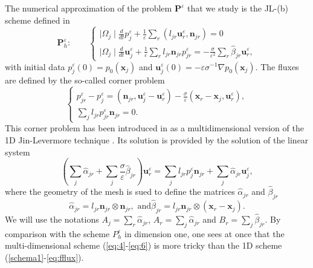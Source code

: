 \documentclass[a4paper,french,english,10pt]{article}
\newcommand\ljr{l_{jr}}
\newcommand\njr{\mathbf{n}_{jr}}
\newcommand\uu{\mathbf{u}}
\newcommand\eps{\varepsilon}
\newcommand\alj{\widehat{\alpha}_{jr}}
\newcommand\bej{\widehat{\beta}_{jr}}
\newcommand\xj{\mathbf{x}_j}
\newcommand\xr{\mathbf{x}_r}
\newcommand\uj{\uu_j}
\newcommand\ur{\uu_r}
\begin{document}
The numerical approximation  
 of the problem  $\mathbf P^\eps$ that we study 
 is the JL-(b) scheme defined
in   \cite{glaceap}
\begin{equation}\label{eq:4}
\mathbf P_h^\eps:
\qquad \left\{ 
\begin{array}{l}
\displaystyle \mid\Omega_{j}\mid\frac{d}{dt} p_{j}^{\eps}+\frac{1}{\varepsilon}
\sum_{r}(l_{jr}\ur^{\eps},\njr)=0\\
\displaystyle \mid
\Omega_{j}\mid\frac{d}{dt}\uj^{\eps}+\frac{1}{\varepsilon}
\sum_{r} l_{jr} \njr    p_{jr}^{\eps}=-\frac{\sigma}{\varepsilon^{2}}\sum_{r}\widehat{
\beta}_{jr}\ur^{\eps},
\end{array}
\right.
\end{equation}
with initial data $p_j^{\eps}(0)=p_0(\mathbf{x}_j)$ and $\mathbf{u}_j^{\eps}(0) = -\eps\sigma^{-1}\nabla p_0(\mathbf{x}_j)$.
The fluxes are defined by the so-called 
corner problem 
\begin{equation}\label{eq:5}
\left\{ \begin{array}{l}
\displaystyle 
p_{jr}^{\eps}-p_j^\eps=
(\njr,    \uj^{\eps}-\ur^{\eps}
)-\frac{\sigma}{\varepsilon}( \xr -\xj, \ur^{\eps}), 
\\
\sum_{j}\ljr
p_{jr}^{\eps}\njr=0.
 \end{array}\right.
\end{equation}
This corner problem has been introduced in 
\cite{glaceap} as a multidimensional version
of the 1D Jin-Levermore technique   \cite{jinlev}.
Its solution is provided by the solution
of the  linear system
\begin{equation*} \label{eq:5bis}
\displaystyle \left( \sum_{j}\alj+ 
\sum_{j}\frac{\sigma}{\varepsilon}\bej\right)\ur^{
\eps}= \sum_{j}\ljr
p_j^{\eps}\njr+\sum_j\alj\uj^{\eps},
\end{equation*}
 where the geometry of the mesh is sued to define the  
  matrices  
$\alj$ and $\bej$ 
\begin{equation}\label{eq:6}
\alj=\ljr\njr\otimes\njr,\mbox{ and
}\bej=\ljr\njr\otimes(\xr-\xj) .
\end{equation}
We will use the notations
$A_j=\sum_r\alj$, $A_r=\sum_j\alj$ and
$B_r=\sum_j\bej$. 
By comparison with the scheme $P_h^\eps$ in dimension one, one sees at once
that the multi-dimensional scheme (\ref{eq:4}-\ref{eq:6})  is  more 
tricky than the 1D scheme (\ref{schema1}-\ref{eq:fflux}).
\end{document}
